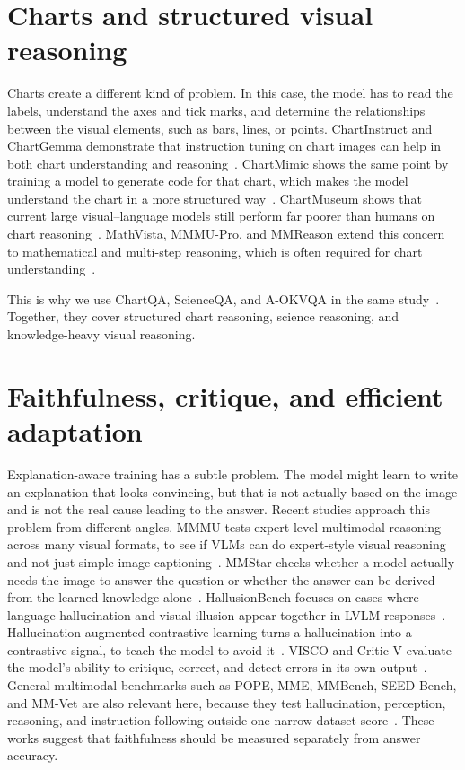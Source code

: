 \section{Charts and structured visual reasoning}
Charts create a different kind of problem.
In this case, the model has to read the labels, understand the axes and tick marks,
and determine the relationships between the visual elements, such as bars, lines, or points.
ChartInstruct and ChartGemma demonstrate that instruction tuning on chart images can help in both chart understanding and reasoning~\cite{masry2024chartinstruct,masry2025chartgemma}.
ChartMimic shows the same point by training a model to generate code for that chart, which makes the model understand the chart in a more structured way~\cite{yang2025chartmimic}.
ChartMuseum shows that current large visual--language models still perform far poorer than humans on chart reasoning~\cite{tang2025chartmuseum}.
MathVista, MMMU-Pro, and MMReason extend this concern to mathematical and multi-step reasoning, which is often required for chart understanding~\cite{lu2024mathvista,yue2025mmmupro,yao2025mmreason}.

This is why we use ChartQA, ScienceQA, and A-OKVQA in the same study~\cite{masry2022chartqa,lu2022scienceqa,schwenk2022aokvqa}.
Together, they cover structured chart reasoning, science reasoning, and knowledge-heavy visual reasoning.


\section{Faithfulness, critique, and efficient adaptation}
Explanation-aware training has a subtle problem.
The model might learn to write an explanation that looks convincing,
but that is not actually based on the image and is not the real cause leading to the answer.
Recent studies approach this problem from different angles.
MMMU tests expert-level multimodal reasoning across many visual formats, to see if VLMs can do expert-style visual reasoning and not just simple image captioning~\cite{yue2024mmmu}.
MMStar checks whether a model actually needs the image to answer the question or whether the answer can be derived from the learned knowledge alone~\cite{chen2024mmstar}.
HallusionBench focuses on cases where language hallucination and visual illusion appear together in LVLM responses~\cite{guan2024hallusionbench}.
Hallucination-augmented contrastive learning turns a hallucination into a contrastive signal, to teach the model to avoid it~\cite{jiang2024hacl}.
VISCO and Critic-V evaluate the model's ability to critique, correct, and detect errors in its own output~\cite{wu2025visco,zhang2025criticv}.
General multimodal benchmarks such as POPE, MME, MMBench, SEED-Bench, and MM-Vet are also relevant here,
because they test hallucination, perception, reasoning, and instruction-following outside one narrow dataset score~\cite{li2023pope,fu2023mme,liu2023mmbench,li2024seedbench,yu2024mmvet}.
These works suggest that faithfulness should be measured separately from answer accuracy.

